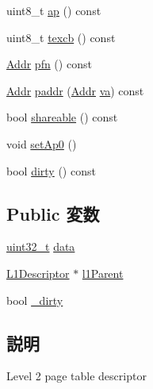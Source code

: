 \begin{DoxyCompactItemize}
uint8\_\-t \hyperlink{classArmISA_1_1TableWalker_1_1L2Descriptor_a4fc87654615da601dbbc3cb6dd1046ee}{ap} () const 
\item 
uint8\_\-t \hyperlink{classArmISA_1_1TableWalker_1_1L2Descriptor_a2f3e1adbe4ca1fa91c6c12f35828dd73}{texcb} () const 
\item 
\hyperlink{classm5_1_1params_1_1Addr}{Addr} \hyperlink{classArmISA_1_1TableWalker_1_1L2Descriptor_ae6bfcb957f6df6777f3294e78ac298af}{pfn} () const 
\item 
\hyperlink{classm5_1_1params_1_1Addr}{Addr} \hyperlink{classArmISA_1_1TableWalker_1_1L2Descriptor_a4fd8dbd54f4412ba92edbf632940c8de}{paddr} (\hyperlink{classm5_1_1params_1_1Addr}{Addr} \hyperlink{namespaceArmISA_a441099e13f407fadb6bcb0447107de87}{va}) const 
\item 
bool \hyperlink{classArmISA_1_1TableWalker_1_1L2Descriptor_a9b831498b02d6b485c2b15f33ccd0582}{shareable} () const 
\item 
void \hyperlink{classArmISA_1_1TableWalker_1_1L2Descriptor_ae309fe90579f95e8236119ad4e4b89c6}{setAp0} ()
\item 
bool \hyperlink{classArmISA_1_1TableWalker_1_1L2Descriptor_ade104a269a8f8f3ef5ded192aede7991}{dirty} () const 
\end{DoxyCompactItemize}
\subsection*{Public 変数}
\begin{DoxyCompactItemize}
\item 
\hyperlink{Type_8hh_a435d1572bf3f880d55459d9805097f62}{uint32\_\-t} \hyperlink{classArmISA_1_1TableWalker_1_1L2Descriptor_a1e43bf7d608e87228b625cca2c04d641}{data}
\item 
\hyperlink{classArmISA_1_1TableWalker_1_1L1Descriptor}{L1Descriptor} $\ast$ \hyperlink{classArmISA_1_1TableWalker_1_1L2Descriptor_a8aab1be246193678f0ae9e775e535c53}{l1Parent}
\item 
bool \hyperlink{classArmISA_1_1TableWalker_1_1L2Descriptor_ad9d7d92a6dc33a9bf186020af3053844}{\_\-dirty}
\end{DoxyCompactItemize}


\subsection{説明}
Level 2 page table descriptor 

